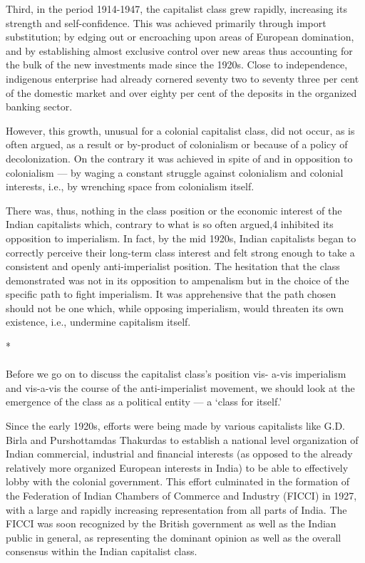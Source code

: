 Third, in the period 1914-1947, the capitalist class grew rapidly, increasing its strength and self-confidence. This was achieved primarily through import substitution; by edging out or encroaching upon areas of European domination, and by establishing almost exclusive control over new areas thus accounting for the bulk of the new investments made since the 1920s. Close to independence, indigenous enterprise had already cornered seventy two to seventy three per cent of the domestic market and over eighty per cent of the deposits in the organized banking sector. 

However, this growth, unusual for a colonial capitalist class, did not occur, as is often argued, as a result or by-product of colonialism or because of a policy of decolonization. On the contrary it was achieved in spite of and in opposition to colonialism — by waging a constant struggle against colonialism and colonial interests, i.e., by wrenching space from colonialism itself. 

There was, thus, nothing in the class position or the economic interest of the Indian capitalists which, contrary to what is so often argued,4 inhibited its opposition to imperialism. In fact, by the mid 1920s, Indian capitalists began to correctly perceive their long-term class interest and felt strong enough to take a consistent and openly anti-imperialist position. The hesitation that the class demonstrated was not in its opposition to ampenalism but in the choice of the specific path to fight imperialism. It was apprehensive that the path chosen should not be one which, while opposing imperialism, would threaten its own existence, i.e., undermine capitalism itself.

\begin{center}*\end{center}

\paragraph*{}
Before we go on to discuss the capitalist class's position vis- a-vis imperialism and vis-a-vis the course of the anti-imperialist movement, we should look at the emergence of the class as a political entity — a `class for itself.' 

Since the early 1920s, efforts were being made by various capitalists like G.D. Birla and Purshottamdas Thakurdas to establish a national level organization of Indian commercial, industrial and financial interests (as opposed to the already relatively more organized European interests in India) to be able to effectively lobby with the colonial government. This effort culminated in the formation of the Federation of Indian Chambers of Commerce and Industry (FICCI) in 1927, with a large and rapidly increasing representation from all parts of India. The FICCI was soon recognized by the British government as well as the Indian public in general, as representing the dominant opinion as well as the overall consensus within the Indian capitalist class. 

